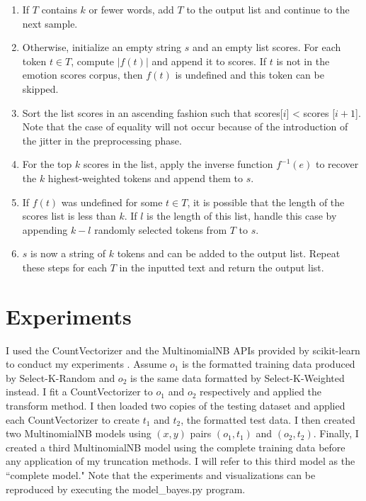 \documentclass[11pt]{article}
\begin{document}
\begin{enumerate}
    \item If $T$ contains $k$ or fewer words, add $T$ to the output list and continue to the next sample.
    \item Otherwise, initialize an empty string $s$ and an empty list scores. For each token $t \in T$, compute $|f(t)|$ and append it to scores. If $t$ is not in the emotion scores corpus, then $f(t)$ is undefined and this token can be skipped.
    \item Sort the list scores in an ascending fashion such that scores[$i$] < scores [$i+1$]. Note that the case of equality will not occur because of the introduction of the jitter in the preprocessing phase.
    \item For the top $k$ scores in the list, apply the inverse function $f^{-1}(e)$ to recover the $k$ highest-weighted tokens and append them to $s$.
    \item If $f(t)$ was undefined for some $t \in T$, it is possible that the length of the scores list is less than $k$. If $l$ is the length of this list, handle this case by appending $k - l$ randomly selected tokens from $T$ to $s$.
    \item $s$ is now a string of $k$ tokens and can be added to the output list. Repeat these steps for each $T$ in the inputted text and return the output list.
\end{enumerate}

\section{Experiments}
I used the CountVectorizer and the MultinomialNB APIs provided by scikit-learn to conduct my experiments \citep{scikit-learn}. Assume $o_1$ is the formatted training data produced by Select-K-Random and $o_2$ is the same data formatted by Select-K-Weighted instead. I fit a CountVectorizer to $o_1$ and $o_2$ respectively and applied the transform method. I then loaded two copies of the testing dataset and applied each CountVectorizer to create $t_1$ and $t_2$, the formatted test data. I then created two MultinomialNB models using $(x, y)$ pairs $(o_1, t_1)$ and $(o_2, t_2)$. Finally, I created a third MultinomialNB model using the complete training data before any application of my truncation methods. I will refer to this third model as the ``complete model." Note that the experiments and visualizations can be reproduced by executing the model\_bayes.py program.
\end{document}
